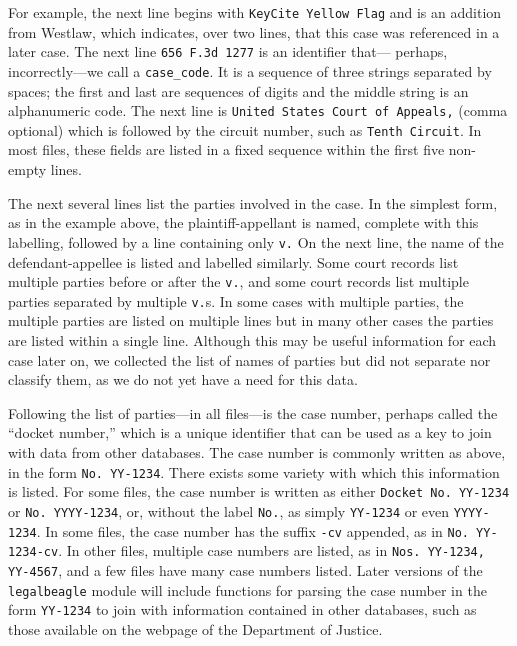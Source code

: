 \documentclass[11pt]{paper}
\begin{document}
For example, the next line begins with \texttt{KeyCite Yellow Flag} and is an 
addition from Westlaw, which indicates, over two lines, that this case was 
referenced in a later case. 
The next line \texttt{656 F.3d 1277} is an identifier that---%
perhaps, incorrectly---we call a \texttt{case\_code}. 
It is a sequence of three strings separated by spaces; the first and last are 
sequences of digits and the middle string is an alphanumeric code. 
The next line is \texttt{United States Court of Appeals,} (comma optional) 
which is followed by the circuit number, such as \texttt{Tenth Circuit}. 
In most files, these fields are listed in a fixed sequence within the first 
five non-empty lines. 

The next several lines list the parties involved in the case. 
In the simplest form, as in the example above, the plaintiff-appellant is 
named, complete with this labelling, followed by a line containing only 
\texttt{v.}
On the next line, the name of the defendant-appellee is listed and labelled 
similarly. 
Some court records list multiple parties before or after the \texttt{v.}, and 
some court records list multiple parties separated by multiple \texttt{v.}s. 
In some cases with multiple parties, the multiple parties are listed on
multiple lines but in many other cases the parties are listed within a 
single line. 
Although this may be useful information for each case later on, we collected 
the list of names of parties but did not separate nor classify them, as we 
do not yet have a need for this data.

Following the list of parties---in all files---is the case number, perhaps 
called the ``docket number,'' which is a unique identifier that can be used 
as a key to join with data from other databases. 
The case number is commonly written as above, in the form \texttt{No. YY-1234}. 
There exists some variety with which this information is listed. 
For some files, the case number is written as either \texttt{Docket No. YY-1234}
or \texttt{No. YYYY-1234}, or, without the label \texttt{No.}, 
as simply \texttt{YY-1234} or even \texttt{YYYY-1234}. 
In some files, the case number has the suffix \texttt{-cv} appended, as in 
\texttt{No. YY-1234-cv}. 
In other files, multiple case numbers are listed, as in 
\texttt{Nos. YY-1234, YY-4567}, and a few files have many case numbers listed. 
Later versions of the \texttt{legalbeagle} module will include functions for 
parsing the case number in the form \texttt{YY-1234} to join with information 
contained in other databases, such as those available on the webpage of the 
Department of Justice.
\end{document}

